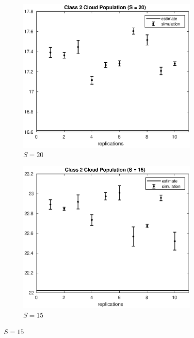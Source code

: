 \begin{figure}[!h]
\centering
%
\begin{subfigure}[t]{0.49\textwidth}
\includegraphics[width=\textwidth]{figures/simul/20_500K_n2cloud}
\caption{$S = 20$}
\label{20_n2cloud}
\end{subfigure}
%
\begin{subfigure}[t]{0.49\textwidth}
\includegraphics[width=\textwidth]{figures/simul/15_500K_n2cloud}
\caption{$S = 15$}
\label{15_n2cloud}
\end{subfigure}

\end{figure}
